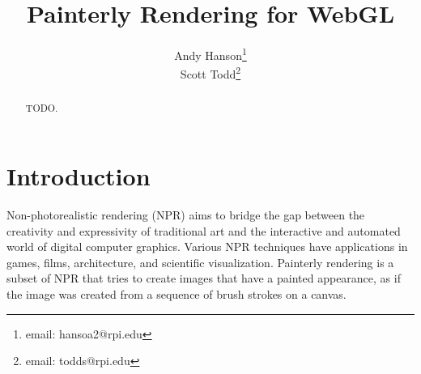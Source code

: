 \documentclass[conference]{acmsiggraph}
\title{Painterly Rendering for WebGL}
\author{Andy Hanson\thanks{email: hansoa2@rpi.edu}\\
        Scott Todd\thanks{email: todds@rpi.edu}}
\begin{document}

\maketitle

\begin{abstract}

TODO.

\end{abstract}



\keywordlist


\TOGlinkslist


\copyrightspace

\section{Introduction}

Non-photorealistic rendering (NPR) aims to bridge the gap between the
creativity and expressivity of traditional art and the interactive and
automated world of digital computer graphics. Various NPR techniques have
applications in games, films, architecture, and scientific visualization.
Painterly rendering is a subset of NPR that tries to create images that have a
painted appearance, as if the image was created from a sequence of brush
strokes on a canvas.
\end{document}
